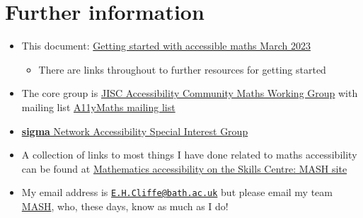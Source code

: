 \documentclass[
  12pt,
  a4paper]{extarticle}
\providecommand{\tightlist}{%
  \setlength{\itemsep}{0pt}\setlength{\parskip}{0pt}}
\theoremstyle{plain}
\theoremstyle{plain}
\theoremstyle{plain}
\theoremstyle{plain}
\theoremstyle{plain}
\theoremstyle{definition}
\theoremstyle{definition}
\theoremstyle{definition}
\theoremstyle{remark}
\renewcommand{\;}{\,}
\begin{document}
\hypertarget{further-information}{%
\section{Further information}\label{further-information}}

\begin{itemize}
\tightlist
\item
  This document: \href{}{Getting started with accessible maths March 2023}

  \begin{itemize}
  \tightlist
  \item
    There are links throughout to further resources for getting started
  \end{itemize}
\item
  The core group is \href{https://github.com/A11yMaths}{JISC Accessibility Community Maths Working Group} with mailing list \href{https://www.jiscmail.ac.uk/cgi-bin/webadmin?A0=ACCESSIBLE-MATHS}{A11yMaths mailing list}
\item
  \href{http://www.sigma-network.ac.uk/sigs/accessibility-sig/}{\textbf{sigma} Network Accessibility Special Interest Group}
\item
  A collection of links to most things I have done related to maths accessibility can be found at \href{https://www.bath.ac.uk/projects/mathematics-accessibility/}{Mathematics accessibility on the Skills Centre: MASH site}
\item
  My email address is \href{mailto:E.H.Cliffe@bath.ac.uk}{\nolinkurl{E.H.Cliffe@bath.ac.uk}} but please email my team \href{mailto:mash@bath.ac.uk}{MASH}, who, these days, know as much as I do!
\end{itemize}
\end{document}
